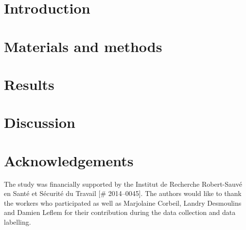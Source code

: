 \documentclass[preprint,review,12pt]{elsarticle}
\begin{document}
    \linenumbers

    \section{Introduction}
    \label{sec:introduction}
    

    \section{Materials and methods}
    \label{sec:materials-and-methods}
    

    \section{Results}
    \label{sec:results}
    

    \section{Discussion}
    \label{sec:discussion}
    

    \section{Acknowledgements}
    \label{sec:acknowledgements}

    The study was financially supported by the Institut de Recherche Robert-Sauvé en Santé et Sécurité du Travail [\# 2014--0045].
    The authors would like to thank the workers who participated as well as Marjolaine Corbeil, Landry Desmoulins and Damien Leflem for their contribution during the data collection and data labelling.

    \appendix
    

    
    
\end{document}
